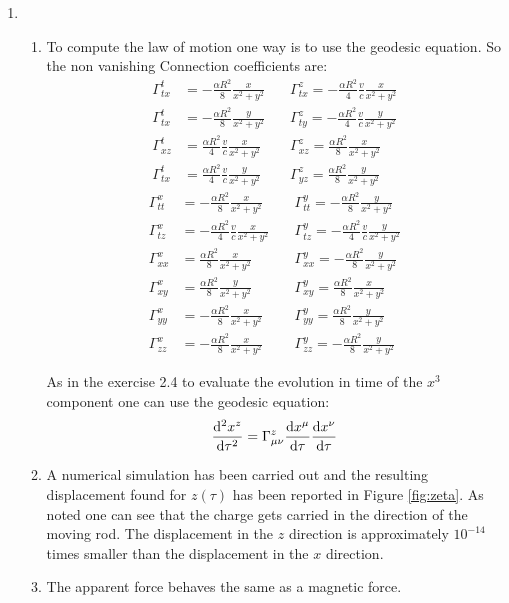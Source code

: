 \documentclass[11pt, oneside]{article}
\newcommand{\G}{\Gamma}
\begin{document}
\begin{enumerate}
\item 
\begin{enumerate}[label=(\alph*)]
	\item To compute the law of motion one way is to use the geodesic equation. So the non vanishing Connection coefficients are:
	\begin{align*}
		\G^{t}_{tx} &= -\frac{\alpha R^2}{8} \frac{x}{x^2+y^2} \quad &\G^{z}_{tx} = -\frac{\alpha R^2}{4} \frac{v}{c} \frac{x}{x^2+y^2}\\
		\G^{t}_{tx} &= -\frac{\alpha R^2}{8} \frac{y}{x^2+y^2} \quad &\G^{z}_{ty} = -\frac{\alpha R^2}{4} \frac{v}{c} \frac{y}{x^2+y^2}\\
		\G^{t}_{xz} &= \frac{\alpha R^2}{4} \frac{v}{c} \frac{x}{x^2+y^2} \quad &\G^{z}_{xz} = \frac{\alpha R^2}{8} \frac{x}{x^2+y^2}\\
		\G^{t}_{tx} &= \frac{\alpha R^2}{4} \frac{v}{c} \frac{y}{x^2+y^2} \quad &\G^{z}_{yz} = \frac{\alpha R^2}{8} \frac{y}{x^2+y^2}
	\end{align*}
	\begin{align*}
		\G^{x}_{tt} &= -\frac{\alpha R^2}{8} \frac{x}{x^2+y^2} \quad &\G^{y}_{tt} = -\frac{\alpha R^2}{8} \frac{y}{x^2+y^2}\\
		\G^{x}_{tz} &= -\frac{\alpha R^2}{4} \frac{v}{c} \frac{x}{x^2+y^2} \quad &\G^{y}_{tz} = -\frac{\alpha R^2}{4} \frac{v}{c} \frac{y}{x^2+y^2}\\
		\G^{x}_{xx} &= \frac{\alpha R^2}{8} \frac{x}{x^2+y^2} \quad &\G^{y}_{xx} = -\frac{\alpha R^2}{8} \frac{y}{x^2+y^2}\\
		\G^{x}_{xy} &= \frac{\alpha R^2}{8} \frac{y}{x^2+y^2}\quad &\G^{y}_{xy} = \frac{\alpha R^2}{8} \frac{x}{x^2+y^2}\\
		\G^{x}_{yy} &= -\frac{\alpha R^2}{8} \frac{x}{x^2+y^2} \quad &\G^{y}_{yy} = \frac{\alpha R^2}{8} \frac{y}{x^2+y^2}\\
		\G^{x}_{zz} &= -\frac{\alpha R^2}{8} \frac{x}{x^2+y^2} \quad &\G^{y}_{zz} = -\frac{\alpha R^2}{8} \frac{y}{x^2+y^2}
	\end{align*}
	
	As in the exercise 2.4 to evaluate the evolution in time of the $x^3$ component one can use the geodesic equation:
	\[
		\dv[2]{x^z}{\tau} = \G^{z}_{\mu\nu} \dv{x^\mu}{\tau} \dv{x^\nu}{\tau}
	\]

		
	\item A numerical simulation has been carried out and the resulting displacement found for $z(\tau)$ has been reported in Figure \ref{fig:zeta}. As noted one can see that the charge gets carried in the direction of the moving rod. The displacement in the $z$ direction is approximately $10^{-14}$ times smaller than the displacement in the $x$ direction.
	
	\item The apparent force behaves the same as a magnetic force.
	
\end{enumerate}

\end{enumerate}
\end{document}
